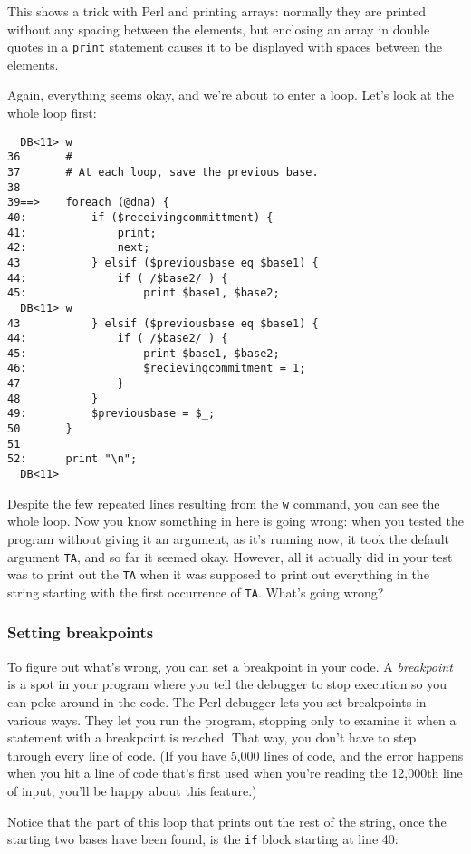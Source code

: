 This shows a trick with Perl and printing arrays: normally they are printed without any spacing between the elements, but enclosing an array in double quotes in a \verb|print| statement causes it to be displayed with spaces between the elements.

Again, everything seems okay, and we're about to enter a loop. Let's look at the whole loop first: 

\begin{lstlisting}
  DB<11> w
36       #
37       # At each loop, save the previous base.
38
39==>    foreach (@dna) {
40:          if ($receivingcommittment) {
41:              print;
42:              next;
43           } elsif ($previousbase eq $base1) {
44:              if ( /$base2/ ) {
45:                  print $base1, $base2; 
  DB<11> w
43           } elsif ($previousbase eq $base1) {
44:              if ( /$base2/ ) {
45:                  print $base1, $base2; 
46:                  $recievingcommitment = 1;
47               }
48           }
49:          $previousbase = $_;
50       }
51
52:      print "\n";
  DB<11>
\end{lstlisting}

Despite the few repeated lines resulting from the \verb|w| command, you can see the whole loop. Now you know something in here is going wrong: when you tested the program without giving it an argument, as it's running now, it took the default argument \verb|TA|, and so far it seemed okay. However, all it actually did in your test was to print out the \verb|TA| when it was supposed to print out everything in the string starting with the first occurrence of \verb|TA|. What's going wrong? 

\subsubsection{Setting breakpoints}
To figure out what's wrong, you can set a breakpoint in your code. A \textit{breakpoint} is a spot in your program where you tell the debugger to stop execution so you can poke around in the code. The Perl debugger lets you set breakpoints in various ways. They let you run the program, stopping only to examine it when a statement with a breakpoint is reached. That way, you don't have to step through every line of code. (If you have 5,000 lines of code, and the error happens when you hit a line of code that's first used when you're reading the 12,000th line of input, you'll be happy about this feature.)

Notice that the part of this loop that prints out the rest of the string, once the starting two bases have been found, is the \verb|if| block starting at line 40: 

